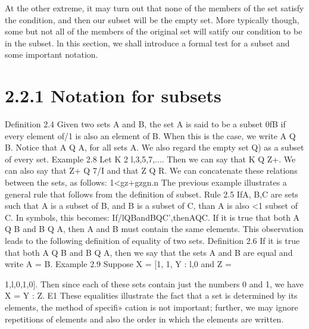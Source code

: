 {{{ 
\smallskip 
\smallskip 
At the other extreme, it may turn out that none of the members
of the set satisfy the condition, and then our subset will be the empty set. More typically though,
some but not all of the members of the original set will satify our condition to be in the subset.
ln this section, we shall introduce a formal test for a subset and some important notation.

\smallskip 
\section{2.2.1 Notation for subsets}
\smallskip 
Deﬁnition 2.4 Given two sets A and B, the set A is said to be a subset 0fB if every element
of/1 is also an element of B. When this is the case, we write A Q B.
Notice that A Q A, for all sets A. We also regard the empty set Q) as a subset of every set.
\smallskip 
\smallskip 
Example 2.8 Let K 2 {l,3,5,7,...}. Then we can say that K Q Z+. We can also say that
Z+ Q 7/I and that Z Q R.
We can concatenate these relations between the sets, as follows:
1<gz+gzgn.n
\smallskip 
\smallskip 
The previous example illustrates a general rule that follows from the deﬁnition of subset.
Rule 2.5 IfA, B,C are sets such that A is a subset of B, and B is a subset of C, than A is also
<1 subset of C. In symbols, this becomes:
If/lQBandBQC’,thenAQC.
\smallskip 
\smallskip 
If it is true that both A Q B and B Q A, then A and B must contain the same elements. This
observation leads to the following deﬁnition of equality of two sets.
Deﬁnition 2.6 If it is true that both A Q B and B Q A, then we say that the sets A and B are
equal and write A = B.
\smallskip 
\smallskip 
Example 2.9 Suppose X = {[1, 1}, Y : {l,0} and Z = {1,l,0,1,0]. Then since each of these
sets contain just the numbers 0 and 1, we have X = Y : Z. E1
These equalities illustrate the fact that a set is determined by its elements, the method of speciﬁ»
cation is not important; further, we may ignore repetitions of elements and also the order in which
the elements are written.
\smallskip 
\smallskip 


}}}}
